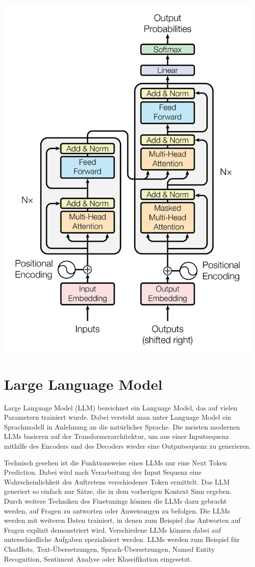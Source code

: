 \includegraphics[width=\linewidth]{figures/transformer_architecture.png}


\section{Large Language Model}

Large Language Model (LLM) bezeichnet ein Language Model, das auf vielen Parametern trainiert wurde. 
Dabei versteht man unter Language Model ein Sprachmodell in Anlehnung an die natürlicher Sprache.
Die meisten modernen LLMs basieren auf der Transformerarchitektur, um aus einer Inputsequenz mithilfe des Encoders und des Decoders wieder eine Outputsequenz zu generieren.


Technisch gesehen ist die Funktionsweise eines LLMs nur eine Next Token Prediction.
Dabei wird nach Verarbeitung der Input Sequenz eine Wahrscheinlichkeit des Auftretens verschiedener Token ermittelt.
Das LLM generiert so einfach nur Sätze, die in dem vorherigen Kontext Sinn ergeben.
Durch weitere Techniken des Finetunings können die LLMs dazu gebracht werden, auf Fragen zu antworten oder Anweisungen zu befolgen.
Die LLMs werden mit weiteren Daten trainiert, in denen zum Beispiel das Antworten auf Fragen explizit demonstriert wird.
Verschiedene LLMs können dabei auf unterschiedliche Aufgaben spezialisiert werden.
LLMs werden zum Beispiel für ChatBots, Text-Übersetzungen, Sprach-Übersetzungen, Named Entity Recognition, Sentiment Analyse oder Klassifikation eingesetzt.



